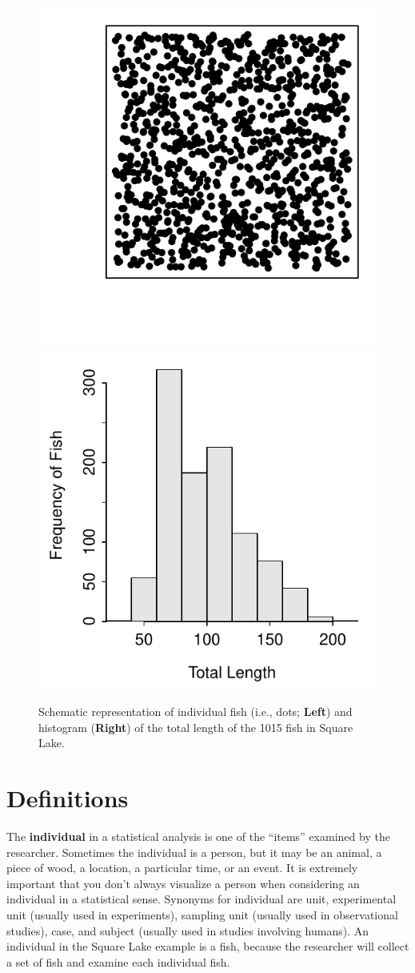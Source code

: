 \documentclass[10pt,openany]{book}\usepackage[]{graphicx}\usepackage[]{color}
\newenvironment{knitrout}{}{} %
\begin{document}
\begin{knitrout}
\color{fgcolor}\begin{figure}[hbtp]

{\centering \includegraphics[width=.4\linewidth]{Figs/SquareLakePopn-1} 
\includegraphics[width=.4\linewidth]{Figs/SquareLakePopn-2} 

}

\caption[Schematic representation of individual fish (i.e., dots]{Schematic representation of individual fish (i.e., dots; \textbf{Left}) and histogram (\textbf{Right}) of the total length of the 1015 fish in Square Lake.}\label{fig:SquareLakePopn}
\end{figure}


\end{knitrout}

\section{Definitions} \label{sect:IVPPSS}
The \textbf{individual} in a statistical analysis is one of the ``items'' examined by the researcher.  Sometimes the individual is a person, but it may be an animal, a piece of wood, a location, a particular time, or an event. It is extremely important that you don't always visualize a person when considering an individual in a statistical sense. Synonyms for individual are unit, experimental unit (usually used in experiments), sampling unit (usually used in observational studies), case, and subject (usually used in studies involving humans). An individual in the Square Lake example is a fish, because the researcher will collect a set of fish and examine each individual fish.
\end{document}
